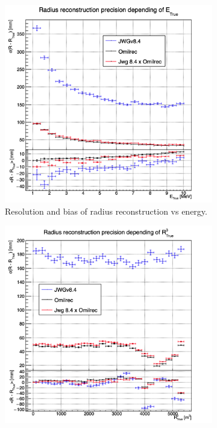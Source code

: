 \documentclass[../main.tex]{subfiles}
\begin{document}
\begin{figure}[ht]
  \begin{subfigure}[t]{0.48\linewidth}
    \centering
    \includegraphics[width=\linewidth]{images/jgnn/MESBvET.png}
    \caption{Resolution and bias of radius reconstruction vs energy.}
    \label{fig:jgnn:MSBvETC}
  \end{subfigure}
  \begin{subfigure}[t]{0.48\linewidth}
    \centering
    \includegraphics[width=\linewidth]{images/jgnn/MSBvRT.png}

\end{subfigure}
\end{figure}
\end{document}
